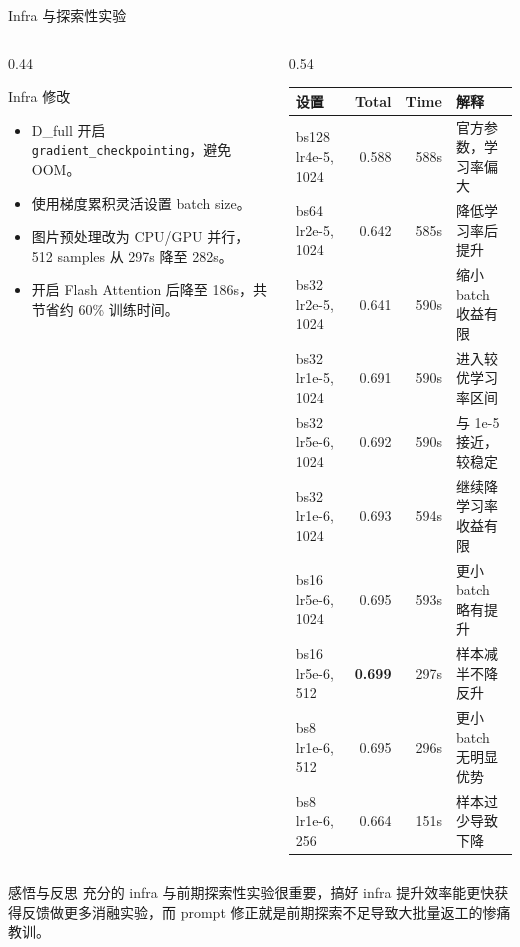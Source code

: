 \documentclass{beamer}
\newcommand{\smalltab}{\scriptsize}
\begin{document}
\begin{frame}[shrink=8]{Infra 与探索性实验}
\small
\begin{columns}[T,onlytextwidth]
\begin{column}{0.44\textwidth}
\begin{block}{Infra 修改}
\begin{itemize}
\item D\_full 开启 \texttt{gradient\_checkpointing}，避免 OOM。
\item 使用梯度累积灵活设置 batch size。
\item 图片预处理改为 CPU/GPU 并行，512 samples 从 297s 降至 282s。
\item 开启 Flash Attention 后降至 186s，共节省约 60\% 训练时间。
\end{itemize}
\end{block}
\end{column}
\begin{column}{0.54\textwidth}
\smalltab
\begin{tabular}{p{}rrp{}}
\toprule
设置 & Total & Time & 解释 \\
\midrule
 bs128 lr4e-5, 1024 & 0.588 & 588s & 官方参数，学习率偏大 \\
 bs64 lr2e-5, 1024 & 0.642 & 585s & 降低学习率后提升 \\
 bs32 lr2e-5, 1024 & 0.641 & 590s & 缩小 batch 收益有限 \\
 bs32 lr1e-5, 1024 & 0.691 & 590s & 进入较优学习率区间 \\
 bs32 lr5e-6, 1024 & 0.692 & 590s & 与 1e-5 接近，较稳定 \\
 bs32 lr1e-6, 1024 & 0.693 & 594s & 继续降学习率收益有限 \\
 bs16 lr5e-6, 1024 & 0.695 & 593s & 更小 batch 略有提升 \\
 bs16 lr5e-6, 512 & \textbf{0.699} & 297s & 样本减半不降反升 \\
 bs8 lr1e-6, 512 & 0.695 & 296s & 更小 batch 无明显优势 \\
 bs8 lr1e-6, 256 & 0.664 & 151s & 样本过少导致下降 \\
\bottomrule
\end{tabular}
\end{column}
\end{columns}
\vspace{0.3em}
\begin{block}{感悟与反思}
充分的 infra 与前期探索性实验很重要，搞好 infra 提升效率能更快获得反馈做更多消融实验，而 prompt 修正就是前期探索不足导致大批量返工的惨痛教训。
\end{block}
\end{frame}
\end{document}
